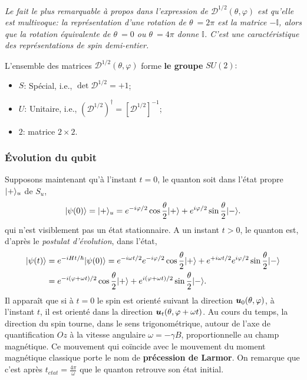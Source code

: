 \medskip\colorbox[gray]{0.8}{
\parbox[c]{0.9\textwidth}{
\emph{Le fait le plus remarquable à propos dans l'expression de
$\mathcal{D}^{1/2}(\theta,\varphi)$ est qu'elle est multivoque: la
représentation d'une rotation de $\theta\ =2\pi$ est la matrice $-\mathbb{I}$,
alors que la rotation équivalente de $\theta\ =0$ ou $\theta\ =4\pi$ donne
$\mathbb{I}$. C'est une caractéristique des représentations de spin
demi-entier.}
}}
\medskip

L'ensemble des matrices $\mathcal{D}^{1/2}(\theta,\varphi)$ forme \textbf{le
groupe} $SU(2):$

\begin{itemize}
\item $S$: Spécial, i.e., $\det\mathcal{D}^{1/2}=+1$;

\item $U$: Unitaire, i.e.,
$(\mathcal{D}^{1/2})^{\dagger}=[\mathcal{D}^{1/2}]^{-1}$;

\item $2$: matrice $2\times2$.
\end{itemize}

\subsubsection{Évolution du qubit}

Supposons maintenant qu'à l'instant $t=0$, le quanton soit dans l'état propre
$\vert+\rangle_{u}$ de $S_{u}$,%
\begin{equation}
\vert\psi(0)\rangle=\vert+\rangle_{u}=e^{-i\varphi/2}\cos\frac{\theta}{2}\vert+\rangle
+e^{i\varphi/2}\sin\frac{\theta}{2}\vert-\rangle.
\end{equation}
qui n'est visiblement pas un état stationnaire. A un instant $t>0$, le quanton
est, d'après le \emph{postulat d'évolution}, dans l'état,
\begin{equation}%
\label{SpinT}%
\begin{split}
\ket{\psi(t)}&  =e^{-iHt/\hbar}\ket{\psi(0)}=e^{-i\omega t/2}e^{-i\varphi/2}\cos
\frac{\theta}{2}\ket{+}+e^{+i\omega t/2}e^{i\varphi/2}\sin\frac{\theta}{2}
\ket{-}\\
&  =e^{-i(\varphi+\omega t) /2}\cos\frac{\theta}{2}\ket{+} +e^{i(\varphi+\omega
t) /2}\sin\frac{\theta}{2}\ket{-}.
\end{split}
\end{equation}%
Il apparaît que si à $t=0$ le spin est orienté suivant la direction
$\boldsymbol{u}_0(\theta,\varphi)$, à l'instant $t$, il est orienté dans la
direction $\boldsymbol{u} _{t}(\theta,\varphi+\omega t)$. Au cours du temps, la
direction du spin tourne, dans le sens trigonométrique, autour de l'axe de
quantification $Oz$ à la vitesse angulaire $\omega=-\gamma B$, proportionnelle
au champ magnétique. Ce mouvement qui coïncide avec le mouvement du moment
magnétique classique porte le nom de \textbf{précession de Larmor}. On remarque
que c'est après $t_{etat}=\frac{4\pi}{\omega}$ que le quanton retrouve son état
initial.

